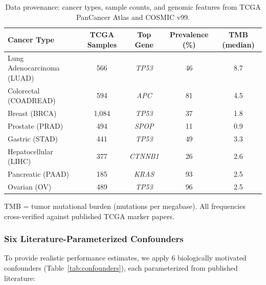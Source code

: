 \documentclass[10pt,a4paper]{article}
\begin{document}
\begin{table}[H]
\centering
\caption{Data provenance: cancer types, sample counts, and genomic features from TCGA PanCancer Atlas and COSMIC v99.}
\label{tab:data_provenance}
\begin{tabular}{l c c c c}
\toprule
\textbf{Cancer Type} & \textbf{TCGA Samples} & \textbf{Top Gene} & \textbf{Prevalence (\%)} & \textbf{TMB (median)} \\
\midrule
Lung Adenocarcinoma (LUAD) & 566 & \textit{TP53} & 46 & 8.7 \\
Colorectal (COADREAD) & 594 & \textit{APC} & 81 & 4.5 \\
Breast (BRCA) & 1,084 & \textit{TP53} & 37 & 1.8 \\
Prostate (PRAD) & 494 & \textit{SPOP} & 11 & 0.9 \\
Gastric (STAD) & 441 & \textit{TP53} & 49 & 3.3 \\
Hepatocellular (LIHC) & 377 & \textit{CTNNB1} & 26 & 2.6 \\
Pancreatic (PAAD) & 185 & \textit{KRAS} & 93 & 2.5 \\
Ovarian (OV) & 489 & \textit{TP53} & 96 & 2.5 \\
\bottomrule
\end{tabular}
\vspace{0.3cm}
\footnotesize{TMB = tumor mutational burden (mutations per megabase). All frequencies cross-verified against published TCGA marker papers.}
\end{table}

\subsubsection{Six Literature-Parameterized Confounders}

To provide realistic performance estimates, we apply 6 biologically motivated confounders (Table~\ref{tab:confounders}), each parameterized from published literature:
\end{document}
